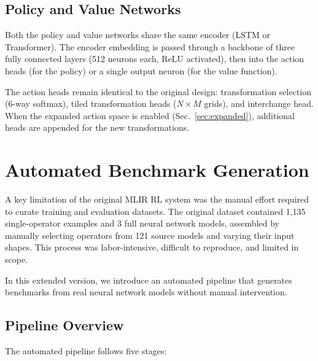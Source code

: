 \documentclass[10pt,twocolumn]{article}
\begin{document}
\subsection{Policy and Value Networks}

Both the policy and value networks share the same encoder (LSTM or Transformer). The encoder embedding is passed through a backbone of three fully connected layers (512 neurons each, ReLU activated), then into the action heads (for the policy) or a single output neuron (for the value function).

The action heads remain identical to the original design: transformation selection (6-way softmax), tiled transformation heads ($N \times M$ grids), and interchange head. When the expanded action space is enabled (Sec.~\ref{sec:expanded}), additional heads are appended for the new transformations.

\section{Automated Benchmark Generation}
\label{sec:benchmarks}

A key limitation of the original MLIR RL system was the manual effort required to curate training and evaluation datasets. The original dataset contained 1,135 single-operator examples and 3 full neural network models, assembled by manually selecting operators from 121 source models and varying their input shapes. This process was labor-intensive, difficult to reproduce, and limited in scope.

In this extended version, we introduce an automated pipeline that generates benchmarks from real neural network models without manual intervention.

\subsection{Pipeline Overview}

The automated pipeline follows five stages:
\end{document}
